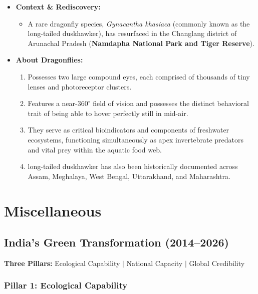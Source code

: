 \begin{itemize}
    \item \textbf{Context \& Rediscovery:} 
    \begin{itemize}
        \item A rare dragonfly species, \textit{Gynacantha khasiaca} (commonly known as the long-tailed duskhawker), has resurfaced in the Changlang district of Arunachal Pradesh (\textbf{Namdapha National Park and Tiger Reserve}).
    \end{itemize}

    \item \textbf{About Dragonflies:} 
    \begin{enumerate}
        \item Possesses two large compound eyes, each comprised of thousands of tiny lenses and photoreceptor clusters.
        \item Features a near-$360^\circ$ field of vision and possesses the distinct behavioral trait of being able to hover perfectly still in mid-air.
        \item They serve as critical bioindicators and components of freshwater ecosystems, functioning simultaneously as apex invertebrate predators and vital prey within the aquatic food web.
        \item long-tailed duskhawker has also been historically documented across Assam, Meghalaya, West Bengal, Uttarakhand, and Maharashtra.
    \end{enumerate} 
\end{itemize}


\section{Miscellaneous}

\subsection{India's Green Transformation (2014--2026)}

\textbf{Three Pillars:} Ecological Capability $|$ National Capacity $|$ Global Credibility

\subsubsection*{Pillar 1: Ecological Capability}


